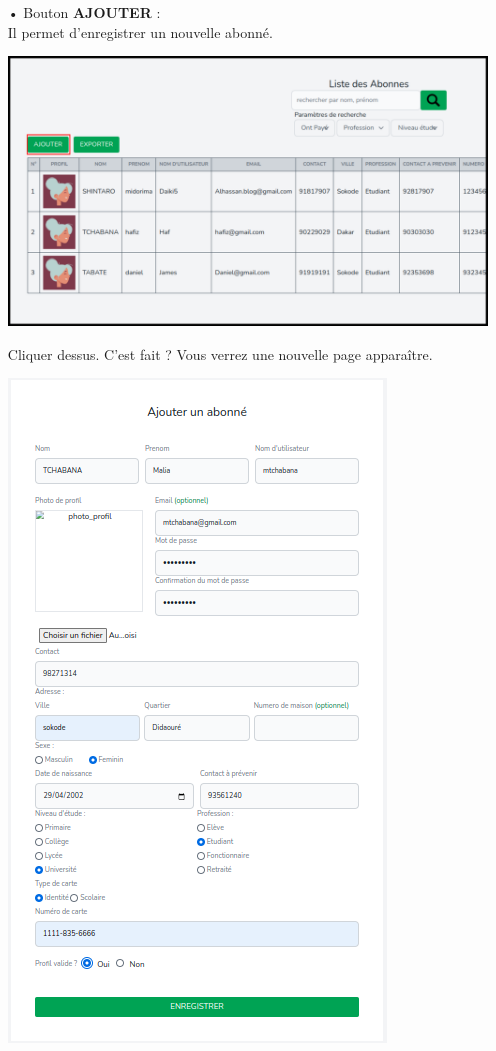 \documentclass[12pt,a4paper]{article}
\begin{document}
\begin{itemize}
\item[•] Bouton \textbf{AJOUTER} : \\
Il permet d'enregistrer un nouvelle abonné.
\begin{center}
\includegraphics[scale=0.3]{img/abonne_create.png}
\end{center}
Cliquer dessus. C'est fait ? Vous verrez
une nouvelle page apparaître. 
\begin{center}
\includegraphics[scale=0.8]{img/abonne_save.png}

\end{center}
\end{itemize}
\end{document}
